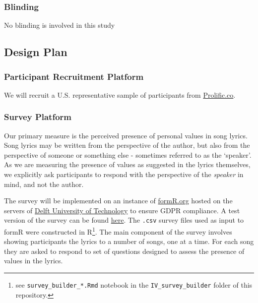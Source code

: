 \documentclass[
  letterpaper,
  DIV=11,
  numbers=noendperiod]{scrartcl}
\begin{document}
\hypertarget{blinding}{%
\subsubsection{Blinding}\label{blinding}}

No blinding is involved in this study

\hypertarget{design-plan}{%
\subsection{Design Plan}\label{design-plan}}

\hypertarget{participant-recruitment-platform}{%
\subsubsection{Participant Recruitment
Platform}\label{participant-recruitment-platform}}

We will recruit a U.S. representative sample of participants from
\href{https://prolific.co}{Prolific.co}.

\hypertarget{survey-platform}{%
\subsubsection{Survey Platform}\label{survey-platform}}

Our primary measure is the perceived presence of personal values in song
lyrics. Song lyrics may be written from the perspective of the author,
but also from the perspective of someone or something else - sometimes
referred to as the `speaker'. As we are measuring the presence of values
as suggested in the lyrics themselves, we explicitly ask participants to
respond with the perspective of the \emph{speaker} in mind, and not the
author.

The survey will be implemented on an instance of
\href{https://formR.org}{formR.org} hosted on the servers of
\href{https://www.tudelft.nl/}{Delft University of Technology} to ensure
GDPR compliance. A test version of the survey can be found
\href{https://testmysurvey.formr.org/}{here}. The \texttt{.csv} survey
files used as input to formR were constructed in R\footnote{see
  \texttt{survey\_builder\_*.Rmd} notebook in the
  \texttt{IV\_survey\_builder} folder of this repository.}. The main
component of the survey involves showing participants the lyrics to a
number of songs, one at a time. For each song they are asked to respond
to set of questions designed to assess the presence of values in the
lyrics.
\end{document}
